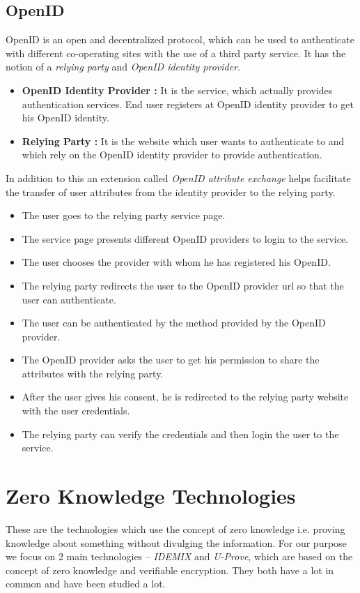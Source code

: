 \subsection{OpenID}
OpenID is an open and decentralized protocol, which can be used to authenticate with different co-operating sites with the use of a third party service. It has the notion of a \textit{relying party} and \textit{OpenID identity provider}.
\begin{itemize}
\item \textbf{OpenID Identity Provider :} It is the service, which actually provides authentication services. End user registers at OpenID identity provider to get his OpenID identity.
\item \textbf{Relying Party :} It is the website which user wants to authenticate to and which rely on the OpenID identity provider to provide authentication.
\end{itemize}
In addition to this an extension called \textit{OpenID attribute exchange}\cite{hardt2007openid} helps facilitate the transfer of user attributes from the identity provider to the relying party.
\begin{itemize}
\item The user goes to the relying party service page.
\item The service page presents different OpenID providers to login to the service.
\item The user chooses the provider with whom he has registered his OpenID.
\item The relying party redirects the user to the OpenID provider url so that the user can authenticate.
\item The user can be authenticated by the method provided by the OpenID provider.
\item The OpenID provider asks the user to get his permission to share the attributes with the relying party.
\item After the user gives his consent, he is redirected to the relying party website with the user credentials.
\item The relying party can verify the credentials and then login the user to the service.
\end{itemize}
\section{Zero Knowledge Technologies}
These are the technologies which use the concept of zero knowledge\cite{ZK} i.e. proving knowledge about something without divulging the information. For our purpose we focus on 2 main technologies – \textit{IDEMIX}\cite{1_zurich_ibm_com_2015} and \textit{U-Prove}\cite{3_research_microsoft_com_2015}, which are based on the concept of zero knowledge\cite{ZK} and verifiable encryption\cite{VE}. They both have a lot in common and have been studied a lot. 
